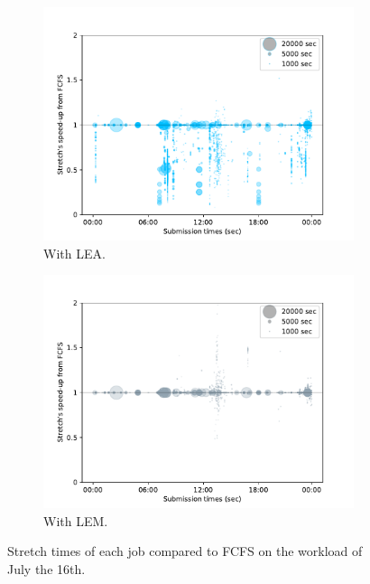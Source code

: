 \documentclass[conference,10pt]{IEEEtran}
\begin{document}
\begin{figure}[tb]\begin{subfigure}[b]{0.49\linewidth}\centering\includegraphics[width=1\linewidth]{../MBSS/plot/Stretch_times/Stretch_times_FCFS_LEA_2022-07-16->2022-07-16_V10000_450_128_32_256_4_1024.pdf}\caption{With LEA.}\label{07_16_fcfs_vs_lea}\end{subfigure}
\begin{subfigure}[b]{0.49\linewidth}\centering\includegraphics[width=1\linewidth]{../MBSS/plot/Stretch_times/Stretch_times_FCFS_LEM_2022-07-16->2022-07-16_V10000_450_128_32_256_4_1024.pdf}\caption{With LEM.}\label{07_16_fcfs_vs_lem}\end{subfigure}\caption{Stretch times of each job compared to FCFS on the workload of July the 16th.}\end{figure}
\end{document}
